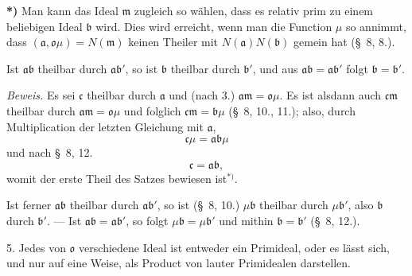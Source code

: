 \documentclass{article}
\begin{document}
\textbf{*)} Man kann das Ideal $\mathfrak{m}$ zugleich so wählen, dass es relativ prim zu einem beliebigen Ideal $\mathfrak{b}$ wird. Dies wird erreicht, wenn man die Function $\mu$ so annimmt, dass $(\mathfrak{a}, \mathfrak{o}\mu) = N(\mathfrak{m})$ keinen Theiler mit $N(\mathfrak{a})N(\mathfrak{b})$ gemein hat (§~8, 8.).


Ist $\mathfrak{a}\mathfrak{b}$ theilbar durch $\mathfrak{a}\mathfrak{b}'$, so ist $\mathfrak{b}$ theilbar durch $\mathfrak{b}'$, und aus $\mathfrak{a}\mathfrak{b} = \mathfrak{a}\mathfrak{b}'$ folgt $\mathfrak{b} = \mathfrak{b}'$.

\emph{Beweis.} Es sei $\mathfrak{c}$ theilbar durch $\mathfrak{a}$ und (nach 3.) $\mathfrak{a}\mathfrak{m} = \mathfrak{o}\mu$. Es ist alsdann auch $\mathfrak{c}\mathfrak{m}$ theilbar durch $\mathfrak{a}\mathfrak{m} = \mathfrak{o}\mu$ und folglich $\mathfrak{c}\mathfrak{m} = \mathfrak{b}\mu$ (§~8, 10., 11.); also, durch Multiplication der letzten Gleichung mit $\mathfrak{a}$,
\[ \mathfrak{c}\mu = \mathfrak{a}\mathfrak{b}\mu \]
und nach §~8, 12.
\[ \mathfrak{c} = \mathfrak{a}\mathfrak{b}, \]
womit der erste Theil des Satzes bewiesen ist${}^{*)}$.

Ist ferner $\mathfrak{a}\mathfrak{b}$ theilbar durch $\mathfrak{a}\mathfrak{b}'$, so ist (§~8, 10.) $\mu\mathfrak{b}$ theilbar durch $\mu\mathfrak{b}'$, also $\mathfrak{b}$ durch $\mathfrak{b}'$. --- Ist $\mathfrak{a}\mathfrak{b} = \mathfrak{a}\mathfrak{b}'$, so folgt $\mu\mathfrak{b} = \mu\mathfrak{b}'$ und mithin $\mathfrak{b} = \mathfrak{b}'$ (§~8, 12.).

5. Jedes von $\mathfrak{o}$ verschiedene Ideal ist entweder ein Primideal, oder es lässt sich, und nur auf eine Weise, als Product von lauter Primidealen darstellen.
\end{document}
